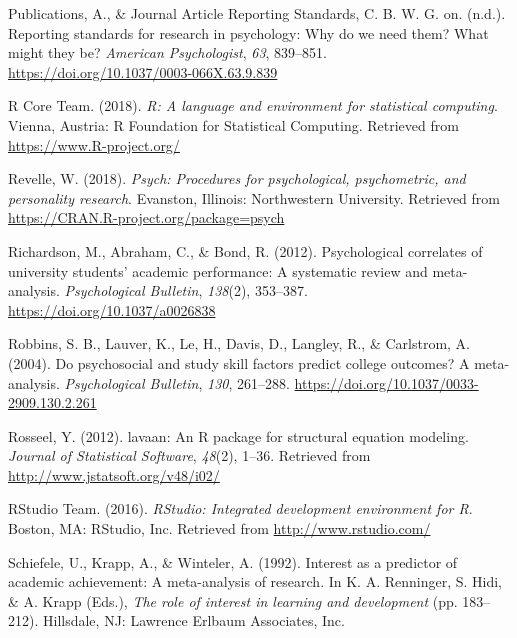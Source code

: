 \documentclass[
  man]{apa6}
\newlength{\cslhangindent}
\newlength{\cslentryspacingunit} %
\newenvironment{CSLReferences}[2] %
 {%
  \setlength{\parindent}{0pt}
  \ifodd #1
  \let\oldpar\par
  \def\par{\hangindent=\cslhangindent\oldpar}
  \fi
  \setlength{\parskip}{#2\cslentryspacingunit}
 }%
 {}
\begin{document}
\begin{CSLReferences}{1}{0}
\leavevmode{}%
Publications, A., \& Journal Article Reporting Standards, C. B. W. G. on. (n.d.). Reporting standards for research in psychology: Why do we need them? What might they be? \emph{American Psychologist}, \emph{63}, 839--851. \url{https://doi.org/10.1037/0003-066X.63.9.839}

\leavevmode{}%
R Core Team. (2018). \emph{R: A language and environment for statistical computing}. Vienna, Austria: R Foundation for Statistical Computing. Retrieved from \url{https://www.R-project.org/}

\leavevmode{}%
Revelle, W. (2018). \emph{Psych: Procedures for psychological, psychometric, and personality research}. Evanston, Illinois: Northwestern University. Retrieved from \url{https://CRAN.R-project.org/package=psych}

\leavevmode{}%
Richardson, M., Abraham, C., \& Bond, R. (2012). Psychological correlates of university students' academic performance: A systematic review and meta-analysis. \emph{Psychological Bulletin}, \emph{138}(2), 353--387. \url{https://doi.org/10.1037/a0026838}

\leavevmode{}%
Robbins, S. B., Lauver, K., Le, H., Davis, D., Langley, R., \& Carlstrom, A. (2004). Do psychosocial and study skill factors predict college outcomes? A meta-analysis. \emph{Psychological Bulletin}, \emph{130}, 261--288. \url{https://doi.org/10.1037/0033-2909.130.2.261}

\leavevmode{}%
Rosseel, Y. (2012). {lavaan}: An {R} package for structural equation modeling. \emph{Journal of Statistical Software}, \emph{48}(2), 1--36. Retrieved from \url{http://www.jstatsoft.org/v48/i02/}

\leavevmode{}%
RStudio Team. (2016). \emph{RStudio: Integrated development environment for {R}}. Boston, MA: RStudio, Inc. Retrieved from \url{http://www.rstudio.com/}

\leavevmode{}%
Schiefele, U., Krapp, A., \& Winteler, A. (1992). Interest as a predictor of academic achievement: A meta-analysis of research. In K. A. Renninger, S. Hidi, \& A. Krapp (Eds.), \emph{The role of interest in learning and development} (pp. 183--212). Hillsdale, NJ: Lawrence Erlbaum Associates, Inc.


\end{CSLReferences}
\end{document}
